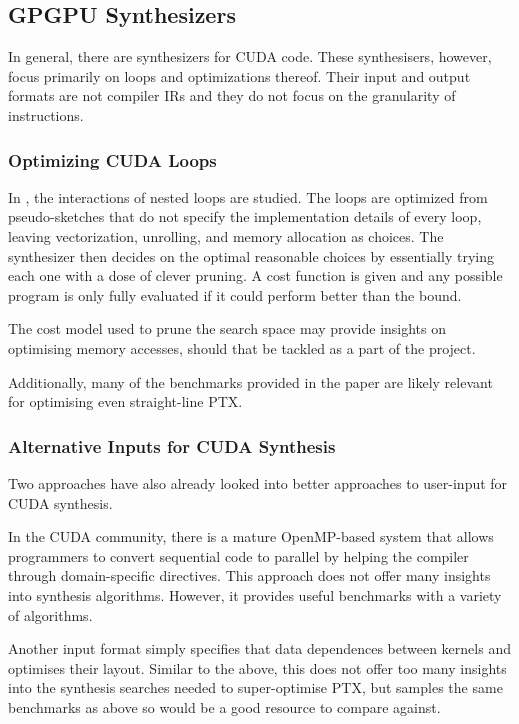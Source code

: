 \documentclass[letterpaper,twocolumn,10pt]{article}
\begin{document}
\subsection{GPGPU Synthesizers}

In general, there are synthesizers for CUDA code.
These synthesisers, however, focus primarily on loops
and optimizations thereof. Their input and output formats
are not compiler IRs and they do not focus on the
granularity of instructions.

\subsubsection{Optimizing CUDA Loops}

In \cite{CUDALoops}, the interactions of nested loops are studied.
The loops are optimized from pseudo-sketches that
do not specify the implementation details of every
loop, leaving vectorization, unrolling, and memory allocation
as choices. The synthesizer then decides on the
optimal reasonable choices by essentially trying
each one with a dose of clever pruning. A cost
function is given and any possible program is
only fully evaluated if it could perform better
than the bound.

The cost model used to prune the search space
may provide insights on optimising memory
accesses, should that be tackled as a part of the
project.

Additionally, many of the benchmarks provided in
the paper are likely relevant for optimising
even straight-line PTX.

\subsubsection{Alternative Inputs for CUDA Synthesis}

Two approaches have also already looked into
better approaches to user-input for CUDA synthesis.

In the CUDA community, there is a mature OpenMP-based
system \cite{hicuda} that allows programmers to
convert sequential code to parallel by helping the
compiler through domain-specific directives.
This approach does not offer many insights into
synthesis algorithms. However, it provides useful
benchmarks with a variety of algorithms.

Another input format simply specifies that data dependences
between kernels and optimises their layout.
\cite{CUDASynth} Similar to the above, this does not
offer too many insights into the synthesis searches
needed to super-optimise PTX, but samples the
same benchmarks as above so would be a good resource
to compare against.
\end{document}
